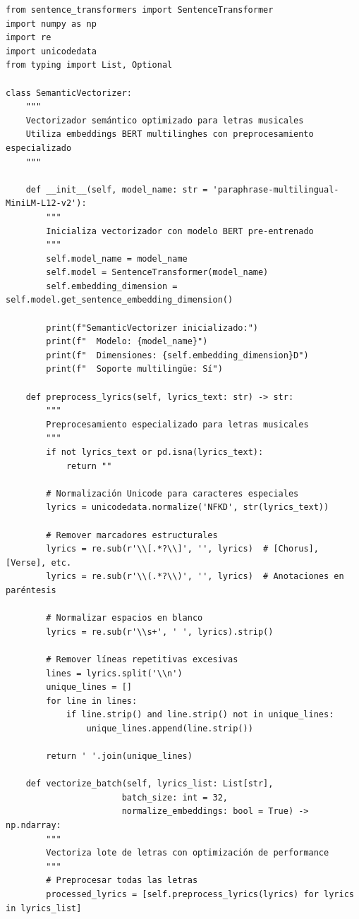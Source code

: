 \documentclass[12pt,a4paper]{report}
\begin{document}
\begin{lstlisting}[caption={Pipeline Completa de Vectorización Semántica BERT}]
from sentence_transformers import SentenceTransformer
import numpy as np
import re
import unicodedata
from typing import List, Optional

class SemanticVectorizer:
    """
    Vectorizador semántico optimizado para letras musicales
    Utiliza embeddings BERT multilinghes con preprocesamiento especializado
    """

    def __init__(self, model_name: str = 'paraphrase-multilingual-MiniLM-L12-v2'):
        """
        Inicializa vectorizador con modelo BERT pre-entrenado
        """
        self.model_name = model_name
        self.model = SentenceTransformer(model_name)
        self.embedding_dimension = self.model.get_sentence_embedding_dimension()

        print(f"SemanticVectorizer inicializado:")
        print(f"  Modelo: {model_name}")
        print(f"  Dimensiones: {self.embedding_dimension}D")
        print(f"  Soporte multilingüe: Sí")

    def preprocess_lyrics(self, lyrics_text: str) -> str:
        """
        Preprocesamiento especializado para letras musicales
        """
        if not lyrics_text or pd.isna(lyrics_text):
            return ""

        # Normalización Unicode para caracteres especiales
        lyrics = unicodedata.normalize('NFKD', str(lyrics_text))

        # Remover marcadores estructurales
        lyrics = re.sub(r'\\[.*?\\]', '', lyrics)  # [Chorus], [Verse], etc.
        lyrics = re.sub(r'\\(.*?\\)', '', lyrics)  # Anotaciones en paréntesis

        # Normalizar espacios en blanco
        lyrics = re.sub(r'\\s+', ' ', lyrics).strip()

        # Remover líneas repetitivas excesivas
        lines = lyrics.split('\\n')
        unique_lines = []
        for line in lines:
            if line.strip() and line.strip() not in unique_lines:
                unique_lines.append(line.strip())

        return ' '.join(unique_lines)

    def vectorize_batch(self, lyrics_list: List[str],
                       batch_size: int = 32,
                       normalize_embeddings: bool = True) -> np.ndarray:
        """
        Vectoriza lote de letras con optimización de performance
        """
        # Preprocesar todas las letras
        processed_lyrics = [self.preprocess_lyrics(lyrics) for lyrics in lyrics_list]


\end{lstlisting}
\end{document}
